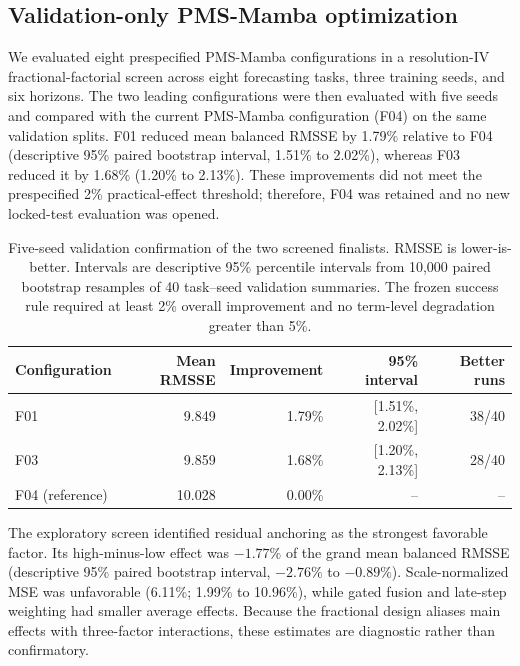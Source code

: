 \subsection{Validation-only PMS-Mamba optimization}
\label{sec:pms-v2-validation}

We evaluated eight prespecified PMS-Mamba configurations in a resolution-IV
fractional-factorial screen across eight forecasting tasks, three training seeds,
and six horizons. The two leading configurations were then evaluated with five
seeds and compared with the current PMS-Mamba configuration (F04) on the same
validation splits. F01 reduced mean balanced RMSSE by 1.79\% relative to F04
(descriptive 95\% paired bootstrap interval, 1.51\% to 2.02\%), whereas F03 reduced
it by 1.68\% (1.20\% to 2.13\%). These improvements did not meet the prespecified
2\% practical-effect threshold; therefore, F04 was retained and no new locked-test
evaluation was opened.

\begin{table}[t]
  \centering
  \caption{Five-seed validation confirmation of the two screened finalists. RMSSE
  is lower-is-better. Intervals are descriptive 95\% percentile intervals from
  10,000 paired bootstrap resamples of 40 task--seed validation summaries. The
  frozen success rule required at least 2\% overall improvement and no term-level
  degradation greater than 5\%.}
  \label{tab:pms-v2-validation}
  \begin{tabular}{lrrrr}
    \toprule
    Configuration & Mean RMSSE & Improvement & 95\% interval & Better runs \\
    \midrule
    F01 & 9.849 & 1.79\% & [1.51\%, 2.02\%] & 38/40 \\
    F03 & 9.859 & 1.68\% & [1.20\%, 2.13\%] & 28/40 \\
    F04 (reference) & 10.028 & 0.00\% & -- & -- \\
    \bottomrule
  \end{tabular}
\end{table}

The exploratory screen identified residual anchoring as the strongest favorable
factor. Its high-minus-low effect was $-1.77\%$ of the grand mean balanced RMSSE
(descriptive 95\% paired bootstrap interval, $-2.76\%$ to $-0.89\%$). Scale-normalized MSE was
unfavorable (6.11\%; 1.99\% to 10.96\%), while gated fusion and late-step weighting
had smaller average effects. Because the fractional design aliases main effects with
three-factor interactions, these estimates are diagnostic rather than confirmatory.

